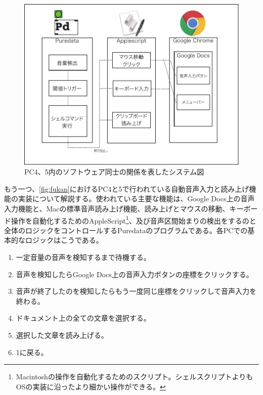 \documentclass[a4paper,report]{jsbook}
\begin{document}
\begin{figure}[htbp]
\centering
\includegraphics[width=1.00000\textwidth]{./img/yomiage_diagram.pdf}
\caption{PC4、5内のソフトウェア同士の関係を表したシステム図\label{fig:yomiage}}
\end{figure}

もう一つ、\cref{fig:fukan}におけるPC4と5で行われている自動音声入力と読み上げ機能の実装について解説する。使われている主要な機能は、Google
Docs上の音声入力機能と、Macの標準音声読み上げ機能、読み上げとマウスの移動、キーボード操作を自動化するためのAppleScript\footnote{Macintoshの操作を自動化するためのスクリプト。シェルスクリプトよりもOSの実装に沿ったより細かい操作ができる。}、及び音声区間始まりの検出をするのと全体のロジックをコントロールするPuredataのプログラムである。各PCでの基本的なロジックはこうである。

\begin{enumerate}
\def\labelenumi{\arabic{enumi}.}
\tightlist
\item
  一定音量の音声を検知するまで待機する。
\item
  音声を検知したらGoogle Docs上の音声入力ボタンの座標をクリックする。
\item
  音声が終了したのを検知したらもう一度同じ座標をクリックして音声入力を終わる。
\item
  ドキュメント上の全ての文章を選択する。
\item
  選択した文章を読み上げる。
\item
  1に戻る。
\end{enumerate}
\end{document}
